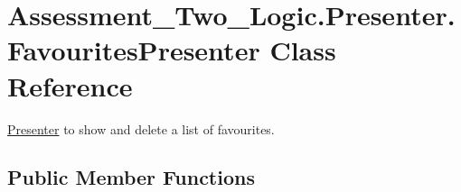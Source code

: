 \hypertarget{class_assessment___two___logic_1_1_presenter_1_1_favourites_presenter}{
\section{Assessment\_\-Two\_\-Logic.Presenter.FavouritesPresenter Class Reference}
\label{class_assessment___two___logic_1_1_presenter_1_1_favourites_presenter}
}


\hyperlink{namespace_assessment___two___logic_1_1_presenter}{Presenter} to show and delete a list of favourites.  


\subsection*{Public Member Functions}
